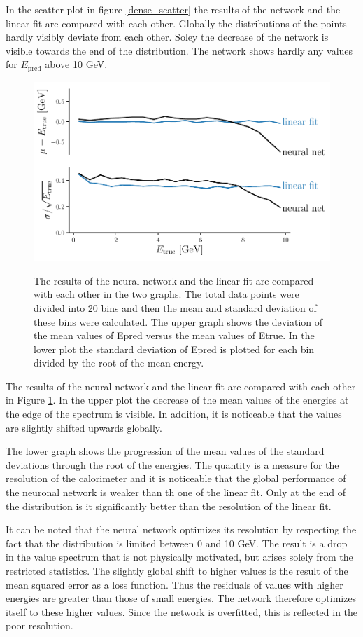 \documentclass[12pt, a4paper]{thesis}
\begin{document}
In the scatter plot in figure \ref{dense_scatter} the results of the
network and the linear fit are compared with each other. Globally the
distributions of the points hardly visibly deviate from each
other. Soley the decrease of the network is visible towards the end of
the distribution.  The network shows hardly any values for
\(E_{\text{pred}}\) above 10 GeV.

\begin{figure}[htbp]
\centering
\includegraphics[width=.9\linewidth]{../images/dense_res.pdf}
\label{dense_res}
\caption{ The results of the neural network and the linear fit are
  compared with each other in the two graphs. The total data points
  were divided into 20 bins and then the mean and standard deviation
  of these bins were calculated. The upper graph shows the deviation
  of the mean values of Epred versus the mean values of Etrue. In the
  lower plot the standard deviation of Epred is plotted for each bin
  divided by the root of the mean energy.}
\end{figure} 

The results of the neural network and the linear fit are compared with each
other in Figure \ref{dense_res}. In the upper plot the decrease of the mean values
of the energies at the edge of the spectrum is visible. In addition, it is
noticeable that the values are slightly shifted upwards globally.

The lower graph shows the progression of the mean values of the standard
deviations through the root of the energies. The quantity is a measure for the
resolution of the calorimeter and it is noticeable that the global performance
of the neuronal network is weaker than th one of the linear fit. Only at the end
of the distribution is it significantly better than the resolution of the linear
fit.

It can be noted that the neural network optimizes its resolution by
respecting the fact that the distribution is limited between 0 and 10
GeV. The result is a drop in the value spectrum that is not physically
motivated, but arises solely from the restricted statistics.  The
slightly global shift to higher values is the result of the mean
squared error as a loss function. Thus the residuals of values with
higher energies are greater than those of small energies. The network
therefore optimizes itself to these higher values. Since the network
is overfitted, this is reflected in the poor resolution.
\end{document}
